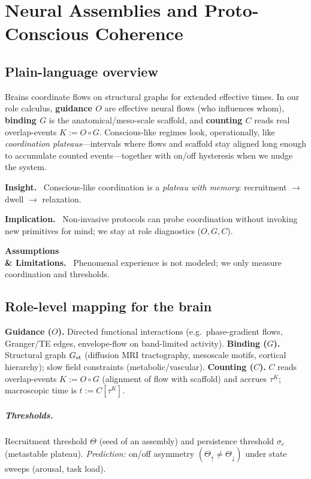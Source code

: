\documentclass[12pt,a4paper,oneside]{scrreprt}
\newenvironment{insight}{\par\vspace{0.5em}\noindent\textbf{Insight.}\ }{\par\vspace{0.5em}}
\newenvironment{implication}{\par\vspace{0.5em}\noindent\textbf{Implication.}\ }{\par\vspace{0.5em}}
\newenvironment{limitation}{\par\vspace{0.5em}\noindent\textbf{Assumptions \\ \& Limitations.}\ }{\par\vspace{0.5em}}
\begin{document}
\chapter{Neural Assemblies and Proto-Conscious Coherence}\label{ch:human-neural}

\section*{Plain-language overview}
Brains coordinate flows on structural graphs for extended effective times. 
In our role calculus, \textbf{guidance $O$} are effective neural flows (who influences whom), \textbf{binding $G$} is the anatomical/meso-scale scaffold, and \textbf{counting $C$} reads real overlap-events $K:=O\!\circ G$. 
Conscious-like regimes look, operationally, like \emph{coordination plateaus}—intervals where flows and scaffold stay aligned long enough to accumulate counted events—together with on/off hysteresis when we nudge the system.

\begin{insight}
Conscious-like coordination is a \emph{plateau with memory}: recruitment $\to$ dwell $\to$ relaxation.
\end{insight}
\begin{implication}
Non-invasive protocols can probe coordination without invoking new primitives for mind; we stay at role diagnostics ($O,G,C$).
\end{implication}
\begin{limitation}
Phenomenal experience is not modeled; we only measure coordination and thresholds.
\end{limitation}

\section{Role-level mapping for the brain}\label{sec:human-mapping}
\textbf{Guidance ($O$).} Directed functional interactions (e.g.\ phase-gradient flows, Granger/TE edges, envelope-flow on band-limited activity).  
\textbf{Binding ($G$).} Structural graph $G_{\rm st}$ (diffusion MRI tractography, mesoscale motifs, cortical hierarchy); slow field constraints (metabolic/vascular).  
\textbf{Counting ($C$).} $C$ reads overlap-events $K:=O\!\circ G$ (alignment of flow with scaffold) and accrues $\tau^K$; macroscopic time is $t:=C[\tau^K]$.

\paragraph{Thresholds.}
Recruitment threshold $\Theta$ (seed of an assembly) and persistence threshold $\sigma_c$ (metastable plateau). 
\emph{Prediction:} on/off asymmetry $(\Theta_\uparrow\neq\Theta_\downarrow)$ under state sweeps (arousal, task load).
\end{document}
